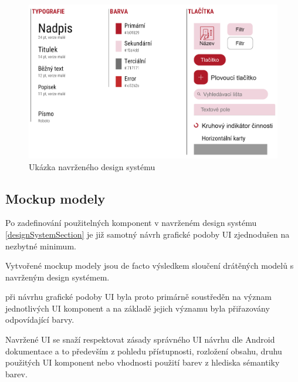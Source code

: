 \begin{figure}[H]
  \centering
  \includegraphics[width=.99\textwidth]{design_system.png}
  \caption{Ukázka navrženého design systému}
  \label{fig:design_system}
\end{figure}

\subsection{Mockup modely} \label{navrhMockupModelu}
Po zadefinování použitelných komponent v navrženém design systému \ref{designSystemSection} je již samotný návrh grafické podoby UI zjednodušen 
na nezbytné minimum. 

Vytvořené mockup modely jsou de facto výsledkem sloučení drátěných modelů s navrženým design systémem.

při návrhu grafické podoby UI byla proto primárně soustředěn na význam jednotlivých UI komponent a na základě jejich významu byla
přiřazovány odpovídající barvy. 

Navržené UI se snaží respektovat zásady správného UI návrhu dle Android dokumentace a to především z pohledu přístupnosti, rozložení obsahu, 
druhu použitých UI komponent nebo vhodnosti použití barev z hlediska sémantiky barev.


